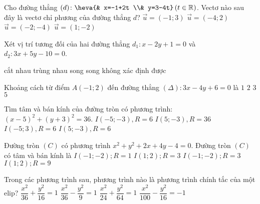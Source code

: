 \begin{ex}
Cho đường thẳng $(d)\colon \heva{& x=-1+2t \\& y=3-4t} \left(t\in \mathbb{R}\right)$. Vectơ nào sau đây là vectơ chỉ phương của đường thẳng $d$?
\choice
{$\vec{u}=(-1;3)$}
{$\vec{u}=(-4;2)$}
{$\vec{u}=(-2;-4)$}
{\True $\vec{u}=(1;-2)$}
\end{ex}
\begin{ex}
 Xét vị trí tương đối của hai đường thẳng $d_1\colon x-2y+1=0$ và $d_2\colon 3x+5y-10=0$.

\choice
{\True cắt nhau}
{trùng nhau}
{song song}
{không xác định được}
\end{ex}
\begin{ex}
 Khoảng cách từ điểm $A(-1;2)$ đến đường thẳng $\left(\Delta\right)\colon 3x-4y+6=0$ là
\choice
{\True $1$}
{$2$}
{$3$}
{$5$}
\end{ex}
\begin{ex}
 Tìm tâm và bán kính của đường tròn có phương trình: ${{(x-5)}^2}+{{(y+3)}^2}=36$.
\choice
{$I(-5;-3),R=6$}
{$I(5;-3),R=36$}
{$I(-5;3),R=6$}
{\True $I(5;-3),R=6$}
\end{ex}
\begin{ex}
 Đường tròn $(C)$ có phương trình $x^2+y^2+2x+4y-4=0$. Đường tròn $(C)$ có tâm và bán kính là
\choice
{$I(-1;-2);R=1$}
{$I(1;2);R=3$}
{\True $I(-1;-2);R=3$}
{$I(1;2);R=9$}
\end{ex}
\begin{ex}
Trong các phương trình sau, phương trình nào là phương trình chính tắc của một elip?
\choice
{\True $\dfrac{x^2}{36}+\dfrac{y^2}{16}=1$ }
{$\dfrac{x^2}{36}-\dfrac{y^2}{9}=1$}
{$\dfrac{x^2}{24}+\dfrac{y^2}{64}=1$}
{$\dfrac{x^2}{100}-\dfrac{y^2}{16}=-1$}
\end{ex}
